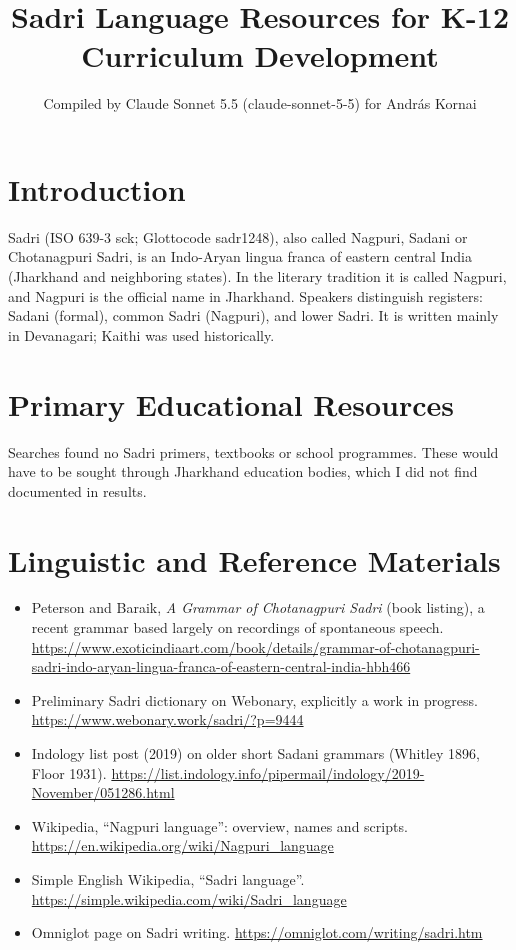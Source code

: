 \documentclass[12pt]{article}
\title{Sadri Language Resources for K-12 Curriculum Development}
\author{Compiled by Claude Sonnet 5.5 (claude-sonnet-5-5) for Andr\'as Kornai}
\date{}
\begin{document}
\maketitle

\section{Introduction}
Sadri (ISO 639-3 sck; Glottocode sadr1248), also called Nagpuri, Sadani or Chotanagpuri Sadri, is an Indo-Aryan lingua franca of eastern central India (Jharkhand and neighboring states). In the literary tradition it is called Nagpuri, and Nagpuri is the official name in Jharkhand. Speakers distinguish registers: Sadani (formal), common Sadri (Nagpuri), and lower Sadri. It is written mainly in Devanagari; Kaithi was used historically.

\section{Primary Educational Resources}
Searches found no Sadri primers, textbooks or school programmes. These would have to be sought through Jharkhand education bodies, which I did not find documented in results.

\section{Linguistic and Reference Materials}
\begin{itemize}
\item Peterson and Baraik, \emph{A Grammar of Chotanagpuri Sadri} (book listing), a recent grammar based largely on recordings of spontaneous speech. \url{https://www.exoticindiaart.com/book/details/grammar-of-chotanagpuri-sadri-indo-aryan-lingua-franca-of-eastern-central-india-hbh466}
\item Preliminary Sadri dictionary on Webonary, explicitly a work in progress. \url{https://www.webonary.work/sadri/?p=9444}
\item Indology list post (2019) on older short Sadani grammars (Whitley 1896, Floor 1931). \url{https://list.indology.info/pipermail/indology/2019-November/051286.html}
\item Wikipedia, ``Nagpuri language'': overview, names and scripts. \url{https://en.wikipedia.org/wiki/Nagpuri_language}
\item Simple English Wikipedia, ``Sadri language''. \url{https://simple.wikipedia.com/wiki/Sadri_language}
\item Omniglot page on Sadri writing. \url{https://omniglot.com/writing/sadri.htm}
\end{itemize}
\end{document}
